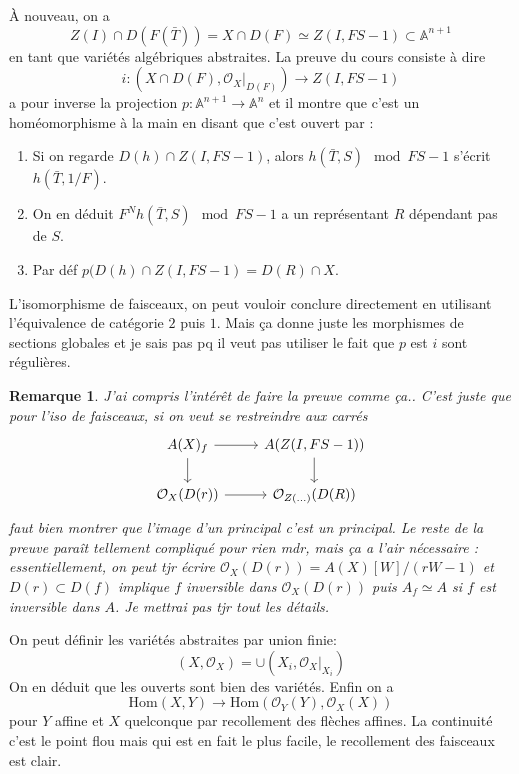 \documentclass[a4paper,12pt]{book}
\newcommand{\A}{\mathbb{A}}
\newcommand{\Or}{\mathcal{O}}
\newcommand{\Hom}{\textrm{Hom}}
\theoremstyle{plain}
\newtheorem{rem}{Remarque}
\theoremstyle{definition}
\theoremstyle{remark}
\begin{document}
À nouveau, on a 
\[Z(I)\cap D(F(\bar T))=X\cap D(F)\simeq Z(I,FS-1)\subset \A^{n+1}\]
en tant que variétés algébriques abstraites. La preuve du cours 
consiste à dire 
\[ i\colon(X\cap D(F),\Or_X|_{D(F)})\to Z(I,FS-1)\]
a pour inverse la projection $p\colon \A^{n+1}\to \A^n$ et il montre
que c'est un homéomorphisme à la main en disant que c'est ouvert par :
\begin{enumerate}
    \item Si on regarde $D(h)\cap Z(I,FS-1)$, alors 
	$h(\bar T, S)\mod FS-1$ s'écrit $h(\bar T, 1/F)$.
    \item On en déduit $F^N h(\bar T, S) \mod FS-1$ a un représentant
	$R$ dépendant pas de $S$. 
    \item Par déf $p(D(h)\cap Z(I, FS-1)=D(R)\cap X$.
\end{enumerate}
L'isomorphisme de faisceaux, on peut vouloir conclure directement en 
utilisant l'équivalence de catégorie $2$ puis $1$. Mais ça donne juste 
les morphismes de sections globales et je sais pas pq il veut pas
utiliser le fait que $p$ est $i$ sont régulières.

\begin{rem}
    J'ai compris l'intérêt de faire la preuve comme ça.. C'est juste
    que pour l'iso de faisceaux, si on veut se restreindre aux carrés
\[\begin{tikzcd}
	{A(X)_f} & {A(Z(I,FS-1))} \\
	{\Or_X(D(r))} & {\Or_{Z(...)}(D(R))}
	\arrow[from=1-1, to=1-2]
	\arrow[from=1-1, to=2-1]
	\arrow[from=1-2, to=2-2]
	\arrow[from=2-1, to=2-2]
\end{tikzcd}\]
    faut bien montrer que l'image d'un principal c'est un principal.
    Le reste de la preuve paraît tellement compliqué pour rien mdr, 
    mais ça a l'air nécessaire : essentiellement, on peut tjr écrire
    $\Or_X(D(r))=A(X)[W]/(rW-1)$ et $D(r)\subset D(f)$ implique
    $f$ inversible dans $\Or_X(D(r))$ puis $A_f\simeq A$ si $f$
    est inversible dans $A$. Je mettrai pas tjr tout les détails.
\end{rem}
On peut définir les variétés abstraites par union finie:
\[(X,\Or_X)=\cup (X_i,\Or_X|_{X_i})\]
On en déduit que les ouverts sont bien des variétés. Enfin on a 
\[\Hom(X,Y)\to \Hom(\Or_Y(Y),\Or_X(X))\]
pour $Y$ affine et $X$ quelconque par recollement des flèches affines.
La continuité c'est le point flou mais qui est en fait le plus facile,
le recollement des faisceaux est clair.
\end{document}

